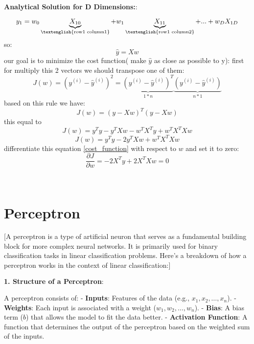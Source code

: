 \documentclass{article}
\renewcommand\text[1]{\textnormal{\textenglish{#1}}}
\newenvironment{cheatformula}[1][כותרת]{
    \begin{minipage}{\linewidth}
    \textbf{#1}:
}{
    \end{minipage}\\[0ex]
}
\begin{document}
\begin{multicols*}{2}
\begin{cheatformula}[Analytical Solution for D Dimensions:]
\begin{equation}
y_{1} = w_{0}\underbrace{X_{10}}_{\text{row1 column1}} + w_{1}\underbrace{X_{11}}_{\text{row1 column2}} + ... + w_{D}X_{1D}
\end{equation}
so: 
\begin{equation}
\widehat{y} = X w
\end{equation}
our goal is to minimize the cost function( make $\widehat{y}$ as close as possible to y):
first for multiply this 2 vectors we should transpose one of them:
\begin{equation}
J(w) =  (y^{(i)} -  \widehat{y}^{(i)})^{2} = \underbrace{(y^{(i)} - \widehat{y}^{(i)})^{T}}_{1*n} \underbrace{(y^{(i)} - \widehat{y}^{(i)})}_{n*1}
\end{equation}
based on this rule we have:
\begin{equation}
J(w) = (y - Xw)^{T}(y - Xw)
\end{equation}
this equal to
\begin{equation}
J(w) = y^{T}y - y^{T}Xw - w^{T}X^{T}y + w^{T}X^{T}Xw
\end{equation}
\begin{equation}
J(w) = y^{T}y - 2y^{T}Xw + w^{T}X^{T}Xw
\label{eq:cost_function}
\end{equation}
differentiate this equation \eqref{cost_function} with respect to $w$ and set it to zero:
$$\frac{\partial J}{\partial w} = -2X^{T}y + 2X^{T}Xw = 0$$


\end{cheatformula}

\pagebreak

\section{Perceptron}[A perceptron is a type of artificial neuron that serves
 as a fundamental building block for more complex neural
  networks. It is primarily used for binary classification
   tasks in linear classification problems. 
   Here’s a breakdown of how a perceptron works in the
    context of linear classification:]

\begin{cheatformula}[1. Structure of a Perceptron]
  A perceptron consists of:
  - \textbf{Inputs}: Features of the data (e.g., $x_1, x_2, \ldots, x_n$).
  - \textbf{Weights}: Each input is associated with a weight ($w_1, w_2, \ldots, w_n$).
  - \textbf{Bias}: A bias term ($b$) that allows the model to fit the data better.
  - \textbf{Activation Function}: A function that determines the output of the perceptron based on the weighted sum of the inputs.
  \end{cheatformula}


\end{multicols*}
\end{document}

